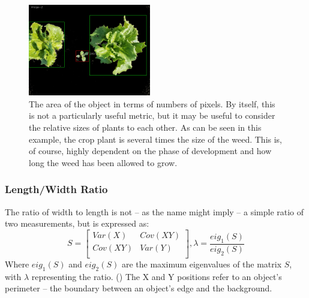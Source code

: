\documentclass[letterpaper]{report}
\begin{document}
{%
\begin{figure}[h!]
	\centering
	\includegraphics[height=4cm]{./figures/shape-area.jpg}
	\caption[Shape attribute: Area \& Size Ratio]{The area of the object in terms of numbers of pixels. By itself, this is not a particularly useful metric, but it may be useful to consider the relative sizes of plants to each other. As can be seen in this example, the crop plant is several times the size of the weed. This is, of course, highly dependent on the phase of development and how long the weed has been allowed to grow.}
	\label{fig:shape-area}
\end{figure}

\subsubsection{Length/Width Ratio}
\label{sec:length-width-ratio}
The ratio of width to length is not -- as the name might imply -- a simple ratio of two measurements, but is expressed as:
\begin{equation}
S = 
	\begin{bmatrix}
	Var(X) & Cov(XY) \\[0.3em]
	Cov(XY) & Var(Y) \\[0.3em]
	\end{bmatrix},
\lambda = \frac {eig_{1}(S)} {eig_{2}(S)}
\end{equation}
Where $eig_{1}(S)$ and $eig_{2}(S)$ are the maximum eigenvalues of the matrix $S$, with $\lambda$ representing the ratio. (\cite{Lin2017-xq}) The X and Y positions refer to an object's perimeter -- the boundary between an object's edge and the background.


}
\end{document}
